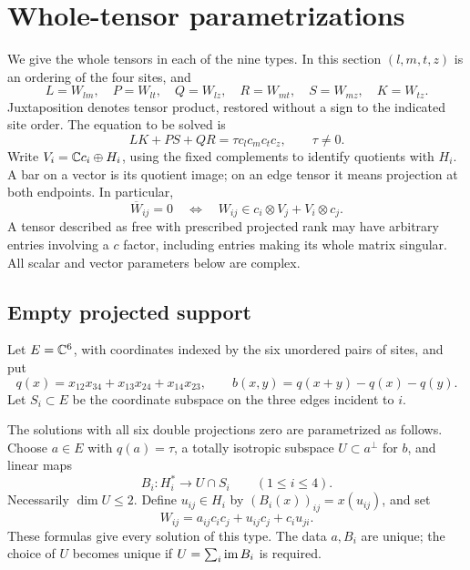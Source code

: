 \section{Whole-tensor parametrizations}\label{atlas:section}

We give the whole tensors in each of the nine types.  In this section
\((l,m,t,z)\) is an ordering of the four sites, and
\[
 L=W_{lm},\quad P=W_{lt},\quad Q=W_{lz},\quad
 R=W_{mt},\quad S=W_{mz},\quad K=W_{tz}.
\]
Juxtaposition denotes tensor product, restored without a sign to the indicated
site order.  The equation to be solved is
\begin{equation}\label{atlas:equation}
 LK+PS+QR=\tau c_lc_mc_tc_z,\qquad \tau\ne0.
\end{equation}
Write \(V_i=\mathbb C c_i\oplus H_i\), using the fixed complements to identify
quotients with \(H_i\).  A bar on a vector is its quotient image; on an edge
tensor it means projection at both endpoints.  In particular,
\begin{equation}\label{atlas:zero-kernel}
 \overline{W}_{ij}=0
 \quad\Longleftrightarrow\quad
 W_{ij}\in c_i\otimes V_j+V_i\otimes c_j.
\end{equation}
A tensor described as free with prescribed projected rank may have arbitrary
entries involving a \(c\) factor, including entries making its whole matrix
singular.  All scalar and vector parameters below are complex.

\subsection{Empty projected support}

Let \(E=\mathbb C^6\), with coordinates indexed by the six unordered pairs of sites,
and put
\[
 q(x)=x_{12}x_{34}+x_{13}x_{24}+x_{14}x_{23},\qquad
 b(x,y)=q(x+y)-q(x)-q(y).
\]
Let \(S_i\subset E\) be the coordinate subspace on the three edges incident
to \(i\).

\begin{proposition}\label{atlas:empty}
The solutions with all six double projections zero are parametrized as follows.
Choose \(a\in E\) with \(q(a)=\tau\), a totally isotropic subspace
\(U\subset a^\perp\) for \(b\), and linear maps
\[
 B_i:H_i^*\longrightarrow U\cap S_i\qquad(1\le i\le4).
\]
Necessarily \(\dim U\le2\).  Define \(u_{ij}\in H_i\) by
\((B_i(x))_{ij}=x(u_{ij})\), and set
\begin{equation}\label{atlas:empty-form}
 W_{ij}=a_{ij}c_ic_j+u_{ij}c_j+c_iu_{ji}.
\end{equation}
These formulas give every solution of this type.  The data \(a,B_i\) are
unique; the choice of \(U\) becomes unique if
\(U=\sum_i\operatorname{im} B_i\) is required.
\end{proposition}

